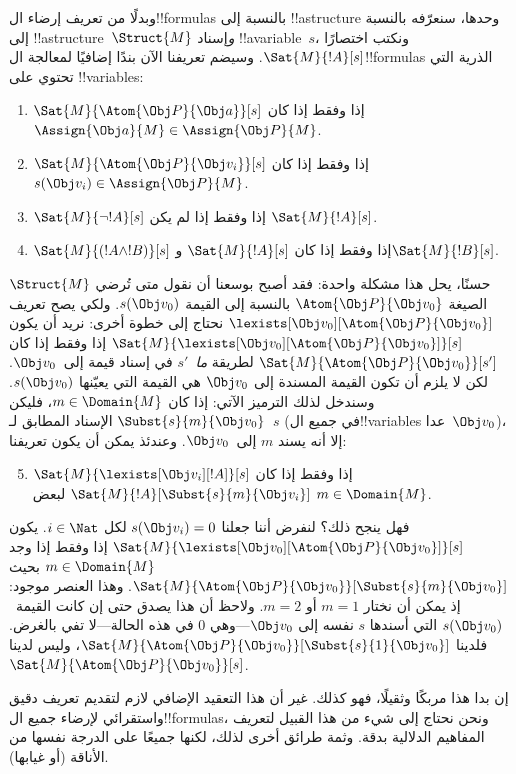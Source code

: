 \documentclass[../../../include/open-logic-section]{subfiles}
\begin{document}
وبدلًا من تعريف إرضاء ال!!{formula}s بالنسبة إلى !!a{structure}
وحدها، سنعرّفه بالنسبة إلى !!a{structure}~$\Struct{M}$
\emph{و}إسناد !!a{variable}~$s$، ونكتب اختصارًا
$\Sat{M}{!A}[s]$. وسيضم تعريفنا الآن بندًا إضافيًا لمعالجة
ال!!{formula}s الذرية التي تحتوي على !!{variable}s:
\begin{enumerate}
  \item $\Sat{M}{\Atom{\Obj P}{\Obj a}}[s]$ إذا وفقط إذا كان
  $\Assign{\Obj a}{M} \in \Assign{\Obj P}{M}$.
  \item $\Sat{M}{\Atom{\Obj P}{\Obj v_i}}[s]$ إذا وفقط إذا كان
  $s(\Obj v_i) \in \Assign{\Obj P}{M}$.
  \item $\Sat{M}{\lnot !A}[s]$ إذا وفقط إذا لم يكن
  $\Sat{M}{!A}[s]$.
  \item $\Sat{M}{(!A \land !B)}[s]$ إذا وفقط إذا كان
  $\Sat{M}{!A}[s]$ و$\Sat{M}{!B}[s]$.
\end{enumerate}
حسنًا، يحل هذا مشكلة واحدة: فقد أصبح بوسعنا أن نقول متى تُرضي
$\Struct{M}$ الصيغة $\Atom{\Obj P}{\Obj v_0}$ بالنسبة إلى القيمة
$s(\Obj v_0)$. ولكي يصح تعريف
$\lexists[\Obj v_0][\Atom{\Obj P}{\Obj v_0}]$ نحتاج إلى خطوة أخرى:
نريد أن يكون
$\Sat{M}{\lexists[\Obj v_0][\Atom{\Obj P}{\Obj v_0}]}[s]$ إذا وفقط
إذا كان $\Sat{M}{\Atom{\Obj P}{\Obj v_0}}[s']$ لطريقة \emph{ما}~$s'$
في إسناد قيمة إلى~$\Obj v_0$. لكن لا يلزم أن تكون القيمة المسندة إلى
$\Obj v_0$ هي القيمة التي يعيّنها $s(\Obj v_0)$. وسندخل لذلك الترميز
الآتي: إذا كان $m \in \Domain{M}$، فليكن
$\Subst{s}{m}{\Obj v_0}$ الإسناد المطابق لـ~$s$ (في جميع
ال!!{variable}s عدا~$\Obj v_0$)، إلا أنه يسند $m$ إلى~$\Obj v_0$.
وعندئذ يمكن أن يكون تعريفنا:
\begin{enumerate}\setcounter{enumi}{4}
  \item $\Sat{M}{\lexists[\Obj v_i][!A]}[s]$ إذا وفقط إذا كان
  $\Sat{M}{!A}[\Subst{s}{m}{\Obj v_i}]$ لبعض
  $m \in \Domain{M}$.
\end{enumerate}
فهل ينجح ذلك؟ لنفرض أننا جعلنا $s(\Obj v_i) = 0$ لكل
$i \in \Nat$. يكون
$\Sat{M}{\lexists[\Obj v_0][\Atom{\Obj P}{\Obj v_0}]}[s]$ إذا وفقط
إذا وجد $m \in \Domain{M}$ بحيث
$\Sat{M}{\Atom{\Obj P}{\Obj v_0}}[\Subst{s}{m}{\Obj v_0}]$. وهذا
العنصر موجود: إذ يمكن أن نختار $m = 1$ أو $m = 2$. ولاحظ أن هذا يصدق
حتى إن كانت القيمة~$s(\Obj v_0)$ التي أسندها $s$ نفسه إلى
$\Obj v_0$---وهي $0$ في هذه الحالة---لا تفي بالغرض. فلدينا
$\Sat{M}{\Atom{\Obj P}{\Obj v_0}}[\Subst{s}{1}{\Obj v_0}]$، وليس
لدينا $\Sat{M}{\Atom{\Obj P}{\Obj v_0}}[s]$.

إن بدا هذا مربكًا وثقيلًا، فهو كذلك. غير أن هذا التعقيد الإضافي لازم
لتقديم تعريف دقيق واستقرائي لإرضاء جميع ال!!{formula}s، ونحن نحتاج
إلى شيء من هذا القبيل لتعريف المفاهيم الدلالية بدقة. وثمة طرائق أخرى
لذلك، لكنها جميعًا على الدرجة نفسها من الأناقة (أو غيابها).
\end{document}
